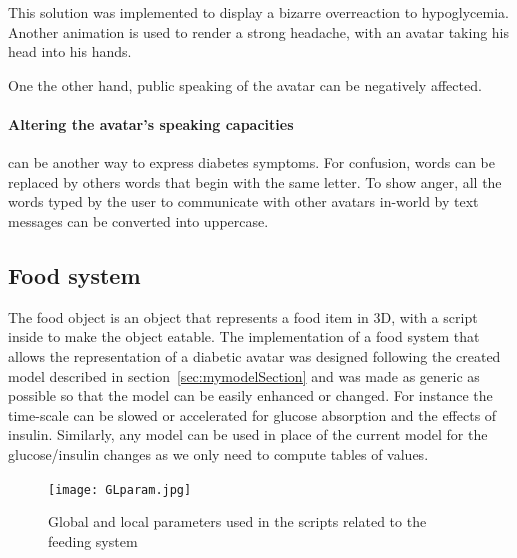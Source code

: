 This solution was implemented to display a bizarre overreaction to hypoglycemia. Another animation is used to render a strong headache, with an avatar taking his head into his hands. 

One the other hand, public speaking of the avatar can be negatively affected.

\paragraph{Altering the avatar's speaking capacities} can be another way to express diabetes symptoms. For confusion, words can be replaced by others words that begin with the same letter. 
To show anger, all the words typed by the user to communicate with other avatars in-world by text messages can be converted into uppercase. 

\subsection{Food system}

The food object is an object that represents a food item in 3D, with a script inside to make the object eatable. The implementation of a food system that allows the representation of a diabetic avatar was designed following the created model described in section~\ref{sec:mymodelSection} and was made as generic as possible so that the model can be easily enhanced or changed. For instance the time-scale can be slowed or accelerated for glucose absorption and the effects of insulin. Similarly, any model can be used in place of the current model for the glucose/insulin changes as we only need to compute tables of values.

\begin{figure}[h]
  \caption{Global and local parameters used in the scripts related to the feeding system}
  \centering
  \texttt{[image: GLparam.jpg]}
  \label{fig:GLparam}
\end{figure}

